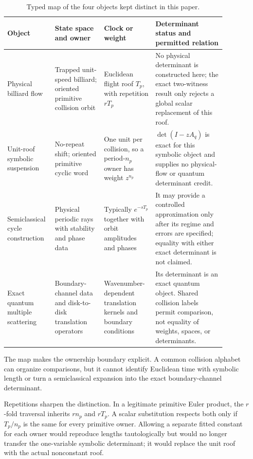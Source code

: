 \documentclass[11pt,a4paper]{article}
\theoremstyle{definition}
\theoremstyle{remark}
\begin{document}
\begin{table}[t]
\centering
\caption{Typed map of the four objects kept distinct in this paper.}
\label{tab:object-map}
\small
\begin{tabular}{p{0.16\linewidth}p{0.21\linewidth}p{0.22\linewidth}p{0.30\linewidth}}
\toprule
Object & State space and owner & Clock or weight & Determinant status and permitted relation \\
\midrule
Physical billiard flow & Trapped unit-speed billiard; oriented primitive collision orbit & Euclidean flight roof \(T_p\), with repetition \(rT_p\) & No physical determinant is constructed here; the exact two-witness result only rejects a global scalar replacement of this roof. \\
Unit-roof symbolic suspension & No-repeat shift; oriented primitive cyclic word & One unit per collision, so a period-\(n_p\) owner has weight \(z^{n_p}\) & \(\det(I-zA_q)\) is exact for this symbolic object and supplies no physical-flow or quantum determinant credit. \\
Semiclassical cycle construction & Physical periodic rays with stability and phase data & Typically \(e^{-sT_p}\) together with orbit amplitudes and phases & It may provide a controlled approximation only after its regime and errors are specified; equality with either exact determinant is not claimed. \\
Exact quantum multiple scattering & Boundary-channel data and disk-to-disk translation operators & Wavenumber-dependent translation kernels and boundary conditions & Its determinant is an exact quantum object. Shared collision labels permit comparison, not equality of weights, spaces, or determinants. \\
\bottomrule
\end{tabular}
\end{table}

The map makes the ownership boundary explicit. A common collision alphabet can organize comparisons, but it cannot identify Euclidean time with symbolic length or turn a semiclassical expansion into the exact boundary-channel determinant.

Repetitions sharpen the distinction. In a legitimate primitive Euler product, the \(r\)-fold traversal inherits \(rn_p\) and \(rT_p\). A scalar substitution respects both only if \(T_p/n_p\) is the same for every primitive owner. Allowing a separate fitted constant for each owner would reproduce lengths tautologically but would no longer transfer the one-variable symbolic determinant; it would replace the unit roof with the actual nonconstant roof.
\end{document}
